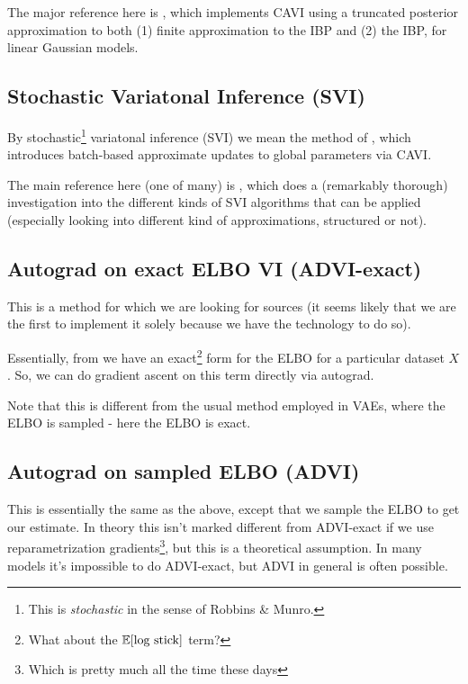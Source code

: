 \documentclass[a4paper, 11pt]{article}
\begin{document}
\medskip

The major reference here is \citet{doshi2009variational}, which implements CAVI using a truncated posterior approximation to both (1) finite approximation to the IBP and (2) the IBP, for linear Gaussian models.

\subsection{Stochastic Variatonal Inference (SVI)}
By stochastic\footnote{This is \emph{stochastic} in the sense of Robbins \& Munro.} variatonal inference (SVI) we mean the method of \citet{hoffman2013stochastic}, which introduces batch-based approximate updates to global parameters via CAVI.

\medskip

The main reference here (one of many) is \citet{shah2015empirical}, which does a (remarkably thorough) investigation into the different kinds of SVI algorithms that can be applied (especially looking into different kind of approximations, structured or not).

\subsection{Autograd on exact ELBO VI (ADVI-exact)}
This is a method for which we are looking for sources (it seems likely that we are the first to implement it solely because we have the technology to do so).

\medskip

Essentially, from \citet{doshi2009report} we have an exact\footnote{What about the $\mathbb{E}[\text{log stick}]$ term?} form for the ELBO for a particular dataset $X$. So, we can do gradient ascent on this term directly via autograd.

\medskip

Note that this is different from the usual method employed in VAEs, where the ELBO is sampled - here the ELBO is exact.

\subsection{Autograd on sampled ELBO (ADVI)}
This is essentially the same as the above, except that we sample the ELBO to get our estimate. In theory this isn't marked different from ADVI-exact if we use reparametrization gradients\footnote{Which is pretty much all the time these days}, but this is a theoretical assumption. In many models it's impossible to do ADVI-exact, but ADVI in general is often possible.
\end{document}
